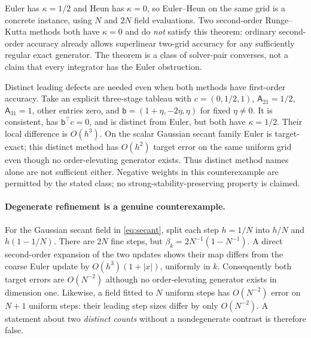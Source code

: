 Euler has $\kappa=1/2$ and Heun has $\kappa=0$, so Euler--Heun on the same
grid is a concrete instance, using $N$ and $2N$ field evaluations.
Two second-order Runge--Kutta methods both have $\kappa=0$ and do
\emph{not} satisfy this theorem: ordinary second-order accuracy already
allows superlinear two-grid accuracy for any sufficiently regular exact generator.
The theorem is a class of solver-pair converses, not a claim that every
integrator has the Euler obstruction.

Distinct leading defects are needed even when both methods have first-order
accuracy.
Take an explicit three-stage tableau with $c=(0,1/2,1)$, $\mathsf A_{21}=1/2$,
$\mathsf A_{31}=1$, other entries zero, and
$\mathsf b=(1+\eta,-2\eta,\eta)$ for fixed $\eta\ne0$.
It is consistent, has $\mathsf b^\top c=0$, and is distinct from Euler, but both
have $\kappa=1/2$. Their local difference is $O(h^3)$.
On the scalar Gaussian secant family Euler is target-exact; this distinct
method has $O(h^2)$ target error on the same uniform grid even though no
order-elevating generator exists. Thus distinct method names alone are not
sufficient either. Negative weights in this counterexample are permitted
by the stated class; no strong-stability-preserving property is claimed.

\paragraph{Degenerate refinement is a genuine counterexample.}
For the Gaussian secant field in \eqref{eq:secant}, split each step $h=1/N$
into $h/N$ and $h(1-1/N)$. There are $2N$ fine steps, but
$\beta_k=2N^{-1}(1-N^{-1})$. A direct second-order expansion of the two
updates shows their map differs from the coarse Euler update by
$O(h^3)(1+|x|)$, uniformly in $k$. Consequently both target errors are
$O(N^{-2})$ although no order-elevating generator exists in dimension one.
Likewise, a field fitted to $N$ uniform steps has $O(N^{-2})$ error on
$N+1$ uniform steps: their leading step sizes differ by only $O(N^{-2})$.
A statement about two \emph{distinct counts} without a nondegenerate
contrast is therefore false.

